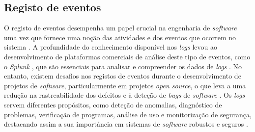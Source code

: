 \subsection{Registo de eventos}

O registo de eventos desempenha um papel crucial na engenharia de \textit{software} uma vez que 
fornece uma noção das atividades e dos eventos que ocorrem no sistema \cite{logs2022}. A profundidade 
do conhecimento disponível nos \textit{logs} levou ao desenvolvimento de plataformas comerciais de 
análise deste tipo de eventos, como o \textit{Splunk} \cite{splunk}, que são essenciais para 
analisar e compreender os dados de \textit{logs} \cite{logs2021}. No entanto, existem desafios nos 
registos de eventos durante o desenvolvimento de projetos de \textit{software}, particularmente em 
projetos \textit{open source}, o que leva a uma redução na rastreabilidade dos defeitos e à
deteção de \textit{bugs} de \textit{software} \cite{logs2018}. Os \textit{logs} servem diferentes 
propósitos, como deteção de anomalias, diagnóstico de problemas, verificação de programas, análise 
de uso e monitorização  de segurança, destacando assim a sua importância em sistemas de
\textit{software} robustos e seguros \cite{logs2019}.

